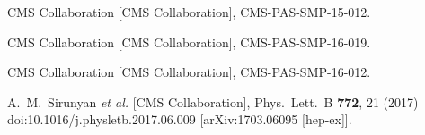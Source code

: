 \documentclass[10pt]{article}
\begin{document}
\begin{thebibliography}{99}
  CMS Collaboration [CMS Collaboration],
  CMS-PAS-SMP-15-012.

  CMS Collaboration [CMS Collaboration],
  CMS-PAS-SMP-16-019.

  CMS Collaboration [CMS Collaboration],
  CMS-PAS-SMP-16-012.

  A.~M.~Sirunyan {\it et al.} [CMS Collaboration],
  Phys.\ Lett.\ B {\bf 772}, 21 (2017)
  doi:10.1016/j.physletb.2017.06.009
  [arXiv:1703.06095 [hep-ex]].

\end{thebibliography}

 
\end{document}

